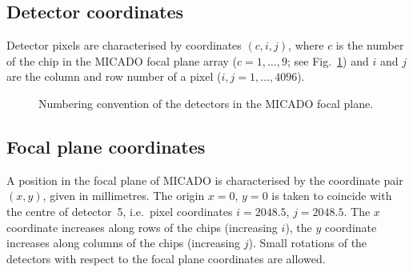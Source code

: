 \documentclass[a4paper,twoside,11pt]{article}
\begin{document}
\subsection{Detector coordinates}

Detector pixels are characterised by coordinates $(c, i, j)$, where
$c$ is the number of the chip in the MICADO focal plane array
($c=1,\dots,9$; see Fig.~\ref{fig:detector_layout}) and $i$ and $j$
are the column and row number of a pixel ($i, j = 1,\dots,4096$).

\begin{figure}[b]
  \centering
  \caption{Numbering convention of the detectors in the MICADO focal
    plane.}
  \label{fig:detector_layout}
\end{figure}

\subsection{Focal plane coordinates}

A position in the focal plane of MICADO is characterised by the
coordinate pair $(x, y)$, given in millimetres. The origin $x=0$,
$y=0$ is taken to coincide with the centre of detector~5, i.e.~pixel
coordinates $i=2048.5$, $j=2048.5$. The $x$ coordinate increases along
rows of the chips (increasing $i$), the $y$ coordinate increases along
columns of the chips (increasing $j$). Small rotations of the
detectors with respect to the focal plane coordinates are allowed.
\end{document}
